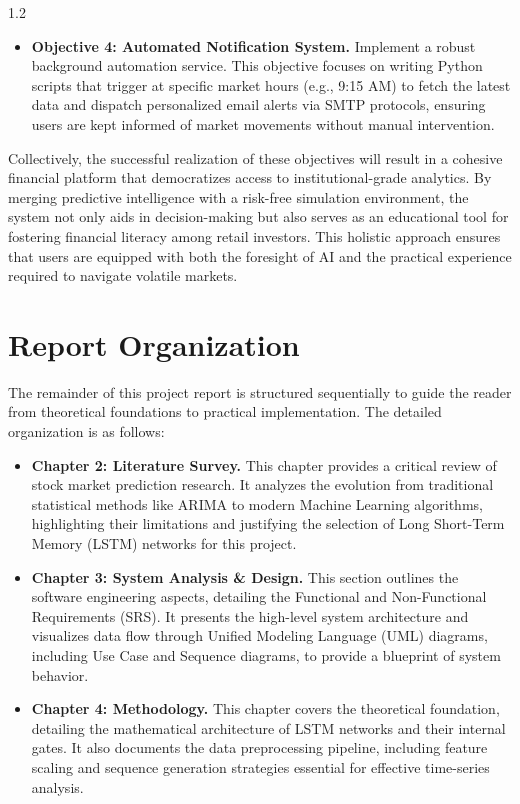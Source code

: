 \documentclass[12pt, a4paper]{report}
\begin{document}
\begin{spacing}{1.2}
\begin{itemize}
\item \textbf{Objective 4: Automated Notification System.} Implement a robust background automation service. This objective focuses on writing Python scripts that trigger at specific market hours (e.g., 9:15 AM) to fetch the latest data and dispatch personalized email alerts via SMTP protocols, ensuring users are kept informed of market movements without manual intervention.
\end{itemize}
Collectively, the successful realization of these objectives will result in a cohesive financial platform that democratizes access to institutional-grade analytics. By merging predictive intelligence with a risk-free simulation environment, the system not only aids in decision-making but also serves as an educational tool for fostering financial literacy among retail investors. This holistic approach ensures that users are equipped with both the foresight of AI and the practical experience required to navigate volatile markets.

\section{Report Organization} The remainder of this project report is structured sequentially to guide the reader from theoretical foundations to practical implementation. The detailed organization is as follows:

\begin{itemize} \item \textbf{Chapter 2: Literature Survey.} This chapter provides a critical review of stock market prediction research. It analyzes the evolution from traditional statistical methods like ARIMA to modern Machine Learning algorithms, highlighting their limitations and justifying the selection of Long Short-Term Memory (LSTM) networks for this project.

\item \textbf{Chapter 3: System Analysis \& Design.} This section outlines the software engineering aspects, detailing the Functional and Non-Functional Requirements (SRS). It presents the high-level system architecture and visualizes data flow through Unified Modeling Language (UML) diagrams, including Use Case and Sequence diagrams, to provide a blueprint of system behavior.

\item \textbf{Chapter 4: Methodology.} This chapter covers the theoretical foundation, detailing the mathematical architecture of LSTM networks and their internal gates. It also documents the data preprocessing pipeline, including feature scaling and sequence generation strategies essential for effective time-series analysis.


\end{itemize}
\end{spacing}
\end{document}
